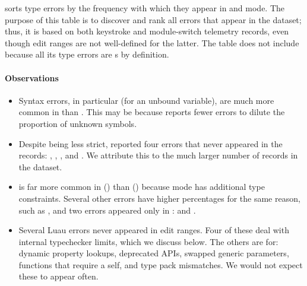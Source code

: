 \documentclass[english,submission,cleveref]{programming}
\begin{document}

 sorts type errors by
the frequency with which they appear
in \mnonstrict{} and \mstrict{} mode.
The purpose of this table is to discover and rank all errors that
appear in the dataset; thus, it is based on both keystroke and
module-switch telemetry records, even though edit ranges are not well-defined
for the latter.
The table does not include \mnocheck{} because all its type errors are
s by definition.


\paragraph{Observations}

\begin{itemize}
  \item
    Syntax errors, in particular  (for an unbound variable),
    are much more common in \mnonstrict{} than \mstrict{}.
    This may be because \mnonstrict{} reports fewer errors
    to dilute the proportion of unknown symbols.

  \item
    Despite being less strict, \mnonstrict{} reported four errors that
    never appeared in the \mstrict{} records:
    , ,
    , and .
    We attribute this to the much larger number of \mnonstrict{} records in the
    dataset.

  \item
     is far more common in \mstrict{} ()
    than \mnonstrict{} () because \mstrict{} mode
    has additional type constraints.
    Several other errors have higher \mstrict{} percentages for the
    same reason, such as , and
    two errors appeared only in \mstrict{}:
     and .

  \item
    Several Luau errors never appeared in edit ranges.
    Four of these deal with internal typechecker limits, which we discuss
    below.
    The others are for: dynamic property lookups,
    deprecated APIs, swapped generic parameters,
    functions that require a self, and type pack mismatches.
    We would not expect these to appear often.


\end{itemize}
\end{document}

